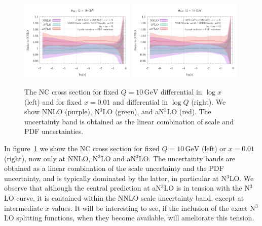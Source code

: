\documentclass[submission, PhysCodeb]{SciPost}
\newcommand{\GEV}{\,\mathrm{GeV}}
\newcommand{\NNNLO}{N$^3$LO}
\begin{document}
\begin{figure}[tb!]
  \centering\includegraphics[width=0.49\textwidth,page=1]{../paper_runs/inclusive_runs/plot/sigma-ratios.pdf}
  \centering\includegraphics[width=0.49\textwidth,page=3]{../paper_runs/inclusive_runs/plot/sigma-ratios.pdf}
  \caption{The NC cross section for fixed $Q=10\GEV$ differential in
    $\log x$ (left) and for fixed $x=0.01$ and differential in $\log
    Q$ (right). We show NNLO (purple), \NNNLO{} (green), and a\NNNLO{}
    (red). The uncertainty band is obtained as the linear combination
    of scale and PDF uncertainties.}
  \label{fig:sigma}
\end{figure}

In figure~\ref{fig:sigma} we show the NC cross section for fixed
$Q=10\GEV$ (left) or $x=0.01$ (right), now only at NNLO, \NNNLO{} and
a\NNNLO{}. The uncertainty bands are obtained as a linear combination
of the scale uncertainty and the PDF uncertainty, and is typically
dominated by the latter, in particular at \NNNLO{}. We observe that
although the central prediction at a\NNNLO{} is in tension with the
\NNNLO{} curve, it is contained within the NNLO scale uncertainty
band, except at intermediate $x$ values. It will be interesting to
see, if the inclusion of the exact \NNNLO{} splitting functions, when
they become available, will ameliorate this tension.
\end{document}
